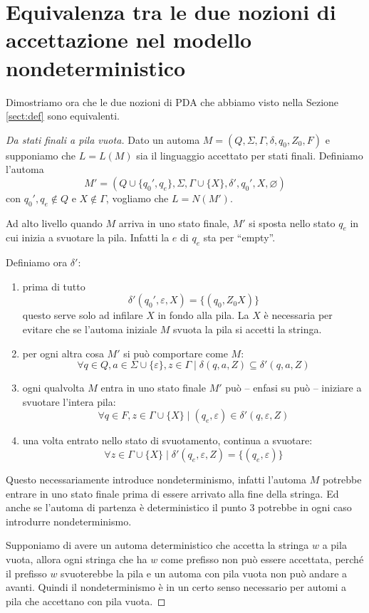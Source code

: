 \documentclass[12pt]{report}
\theoremstyle{definition}
\theoremstyle{regard}
\begin{document}
\section{Equivalenza tra le due nozioni di accettazione nel modello nondeterministico}\label{sect:eq-nondet}
Dimostriamo ora che le due nozioni di PDA che abbiamo visto nella Sezione \ref{sect:def} sono equivalenti.
\begin{proof}[Da stati finali a pila vuota]
Dato un automa $M = (Q, \Sigma, \Gamma, \delta, q_0, Z_0, F)$ e supponiamo che $L = L(M)$ sia il linguaggio accettato per stati finali.
Definiamo l'automa 
$$M' = (Q \cup \{q_0', q_e\}, \Sigma, \Gamma \cup \{X\}, \delta', q_0', X, \varnothing)$$
con $q_0', q_e \not \in Q$ e $X \not \in \Gamma$, vogliamo che $L= N(M')$.

Ad alto livello quando $M$ arriva in uno stato finale, $M'$ si sposta nello stato $q_e$ in cui inizia a svuotare la pila.
Infatti la $e$ di $q_e$ sta per ``empty''.

Definiamo ora $\delta'$:
\begin{enumerate}
	\item prima di tutto 
		$$ \delta'(q_0', \varepsilon, X) = \{(q_0, Z_0X)\} $$
		questo serve solo ad infilare $X$ in fondo alla pila.
		La $X$ è necessaria per evitare che se l'automa iniziale $M$ svuota la pila si accetti la stringa.
	\item per ogni altra cosa $M'$ si può comportare come $M$:
		$$ \forall q \in Q, a \in \Sigma \cup \{\varepsilon\}, z \in \Gamma \mid \delta(q, a, Z) \subseteq \delta'(q, a, Z) $$
	\item ogni qualvolta $M$ entra in uno stato finale $M'$ può -- enfasi su può -- iniziare a svuotare l'intera pila:
		$$ \forall q \in F, z \in \Gamma \cup \{X\} \mid (q_e, \varepsilon) \in \delta'(q, \varepsilon, Z) $$
	\item una volta entrato nello stato di svuotamento, continua a svuotare:
		$$ \forall z \in \Gamma \cup \{X\} \mid \delta'(q_e, \varepsilon, Z) = \{(q_e, \varepsilon)\}$$ 
\end{enumerate}

Questo necessariamente introduce nondeterminismo, infatti l'automa $M$ potrebbe entrare in uno stato finale prima di essere arrivato alla fine della stringa.
Ed anche se l'automa di partenza è deterministico il punto $3$ potrebbe in ogni caso introdurre nondeterminismo.

Supponiamo di avere un automa deterministico che accetta la stringa $w$ a pila vuota, allora ogni stringa che ha $w$ come prefisso non può essere accettata, perché il prefisso $w$ svuoterebbe la pila e un automa con pila vuota non può andare a avanti.
Quindi il nondeterminismo è in un certo senso necessario per automi a pila che accettano con pila vuota.
\end{proof}
\end{document}
